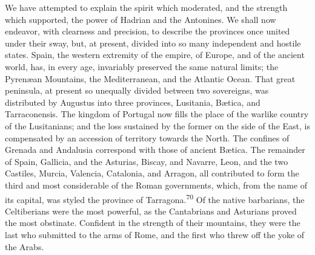 



We have attempted to explain the spirit which moderated, and the
strength which supported, the power of Hadrian and the Antonines.
We shall now endeavor, with clearness and precision, to describe
the provinces once united under their sway, but, at present,
divided into so many independent and hostile states. Spain, the
western extremity of the empire, of Europe, and of the ancient
world, has, in every age, invariably preserved the same natural
limits; the Pyrenæan Mountains, the Mediterranean, and the
Atlantic Ocean. That great peninsula, at present so unequally
divided between two sovereigns, was distributed by Augustus into
three provinces, Lusitania, Bætica, and Tarraconensis. The
kingdom of Portugal now fills the place of the warlike country of
the Lusitanians; and the loss sustained by the former on the side
of the East, is compensated by an accession of territory towards
the North. The confines of Grenada and Andalusia correspond with
those of ancient Bætica. The remainder of Spain, Gallicia, and
the Asturias, Biscay, and Navarre, Leon, and the two Castiles,
Murcia, Valencia, Catalonia, and Arragon, all contributed to form
the third and most considerable of the Roman governments, which,
from the name of its capital, was styled the province of
Tarragona.\textsuperscript{70} Of the native barbarians, the Celtiberians were the
most powerful, as the Cantabrians and Asturians proved the most
obstinate. Confident in the strength of their mountains, they
were the last who submitted to the arms of Rome, and the first
who threw off the yoke of the Arabs.


